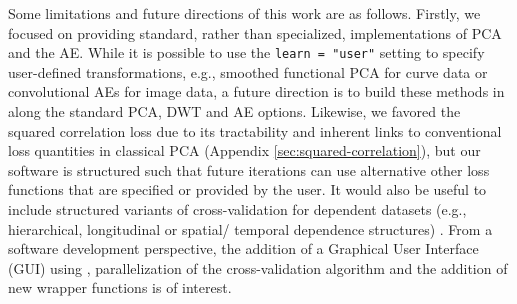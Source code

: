 Some limitations and future directions of this work are as follows.
Firstly, we focused on providing standard, rather than specialized, implementations of PCA and the AE.
While it is possible to use the \texttt{learn = "user"} setting to specify user-defined transformations, e.g., smoothed functional PCA for curve data or convolutional AEs for image data, a future direction is to build these methods in along the standard PCA, DWT and AE options.
Likewise, we favored the squared correlation loss due to its tractability and inherent links to conventional loss quantities in classical PCA (Appendix \ref{sec:squared-correlation}), but our software is structured such that future iterations can use alternative other loss functions \parencite[e.g., concordance index, see][]{yang_quantile_2020} that are specified or provided by the user.
It would also be useful to include structured variants of cross-validation for dependent datasets (e.g., hierarchical, longitudinal or spatial/ temporal dependence structures) \parencite{bergmeir_note_2018, hornung_evaluating_2023, roberts_cross-validation_2017}.
From a software development perspective, the addition of a Graphical User Interface (GUI) using  \parencite{chang_shiny_2021}, parallelization of the cross-validation algorithm and the addition of new wrapper functions is of interest.